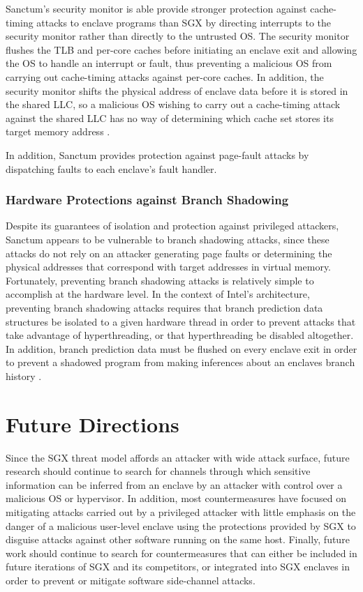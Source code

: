 Sanctum's security monitor is able provide stronger protection against cache-timing attacks to enclave programs than SGX by directing interrupts to the security monitor rather than directly to the untrusted OS. The security monitor flushes the TLB and per-core caches before initiating an enclave exit and allowing the OS to handle an interrupt or fault, thus preventing a malicious OS from carrying out cache-timing attacks against per-core caches. In addition, the security monitor shifts the physical address of enclave data before it is stored in the shared LLC, so a malicious OS wishing to carry out a cache-timing attack against the shared LLC has no way of determining which cache set stores its target memory address \cite{costan_sanctum:_2016, costan_sanctum:_2015}.

In addition, Sanctum provides protection against page-fault attacks by dispatching faults to each enclave's fault handler. 

\subsubsection{Hardware Protections against Branch Shadowing}

Despite its guarantees of isolation and protection against privileged attackers, Sanctum appears to be vulnerable to branch shadowing attacks, since these attacks do not rely on an attacker generating page faults or determining the physical addresses that correspond with target addresses in virtual memory. Fortunately, preventing branch shadowing attacks is relatively simple to accomplish at the hardware level. In the context of Intel's architecture, preventing branch shadowing attacks requires that branch prediction data structures be isolated to a given hardware thread in order to prevent attacks that take advantage of hyperthreading, or that hyperthreading be disabled altogether. In addition, branch prediction data must be flushed on every enclave exit in order to prevent a shadowed program from making inferences about an enclaves branch history \cite{costan_sanctum:_2016, costan_sanctum:_2015, lee_inferring_2017}.

\section{Future Directions}

Since the SGX threat model affords an attacker with wide attack surface, future research should continue to search for channels through which sensitive information can be inferred from an enclave by an attacker with control over a malicious OS or hypervisor. In addition, most countermeasures have focused on mitigating attacks carried out by a privileged attacker with little emphasis on the danger of a malicious user-level enclave using the protections provided by SGX to disguise attacks against other software running on the same host. Finally, future work should continue to search for countermeasures that can either be included in future iterations of SGX and its competitors, or integrated into SGX enclaves in order to prevent or mitigate software side-channel attacks.


